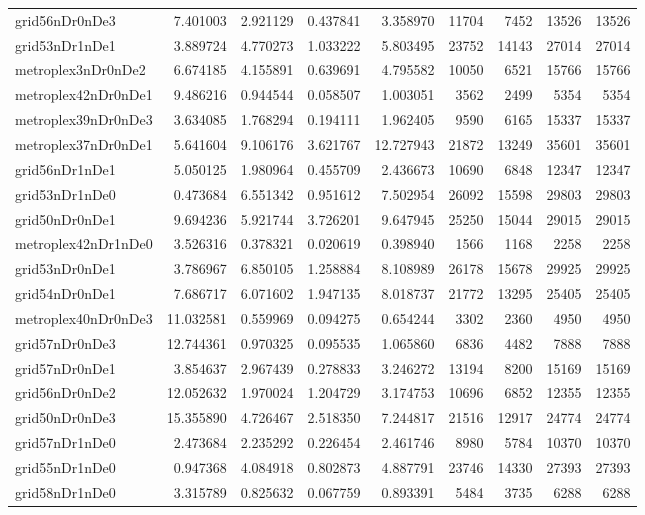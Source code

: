 \begin{longtable}{|l|r|r|r|r|r|r|r|r|}
grid56nDr0nDe3 & 7.401003 & 2.921129 & 0.437841 & 3.358970 & 11704 & 7452 & 13526 & 13526 \\
grid53nDr1nDe1 & 3.889724 & 4.770273 & 1.033222 & 5.803495 & 23752 & 14143 & 27014 & 27014 \\
metroplex3nDr0nDe2 & 6.674185 & 4.155891 & 0.639691 & 4.795582 & 10050 & 6521 & 15766 & 15766 \\
metroplex42nDr0nDe1 & 9.486216 & 0.944544 & 0.058507 & 1.003051 & 3562 & 2499 & 5354 & 5354 \\
metroplex39nDr0nDe3 & 3.634085 & 1.768294 & 0.194111 & 1.962405 & 9590 & 6165 & 15337 & 15337 \\
metroplex37nDr0nDe1 & 5.641604 & 9.106176 & 3.621767 & 12.727943 & 21872 & 13249 & 35601 & 35601 \\
grid56nDr1nDe1 & 5.050125 & 1.980964 & 0.455709 & 2.436673 & 10690 & 6848 & 12347 & 12347 \\
grid53nDr1nDe0 & 0.473684 & 6.551342 & 0.951612 & 7.502954 & 26092 & 15598 & 29803 & 29803 \\
grid50nDr0nDe1 & 9.694236 & 5.921744 & 3.726201 & 9.647945 & 25250 & 15044 & 29015 & 29015 \\
metroplex42nDr1nDe0 & 3.526316 & 0.378321 & 0.020619 & 0.398940 & 1566 & 1168 & 2258 & 2258 \\
grid53nDr0nDe1 & 3.786967 & 6.850105 & 1.258884 & 8.108989 & 26178 & 15678 & 29925 & 29925 \\
grid54nDr0nDe1 & 7.686717 & 6.071602 & 1.947135 & 8.018737 & 21772 & 13295 & 25405 & 25405 \\
metroplex40nDr0nDe3 & 11.032581 & 0.559969 & 0.094275 & 0.654244 & 3302 & 2360 & 4950 & 4950 \\
grid57nDr0nDe3 & 12.744361 & 0.970325 & 0.095535 & 1.065860 & 6836 & 4482 & 7888 & 7888 \\
grid57nDr0nDe1 & 3.854637 & 2.967439 & 0.278833 & 3.246272 & 13194 & 8200 & 15169 & 15169 \\
grid56nDr0nDe2 & 12.052632 & 1.970024 & 1.204729 & 3.174753 & 10696 & 6852 & 12355 & 12355 \\
grid50nDr0nDe3 & 15.355890 & 4.726467 & 2.518350 & 7.244817 & 21516 & 12917 & 24774 & 24774 \\
grid57nDr1nDe0 & 2.473684 & 2.235292 & 0.226454 & 2.461746 & 8980 & 5784 & 10370 & 10370 \\
grid55nDr1nDe0 & 0.947368 & 4.084918 & 0.802873 & 4.887791 & 23746 & 14330 & 27393 & 27393 \\
grid58nDr1nDe0 & 3.315789 & 0.825632 & 0.067759 & 0.893391 & 5484 & 3735 & 6288 & 6288 \\

\end{longtable}
